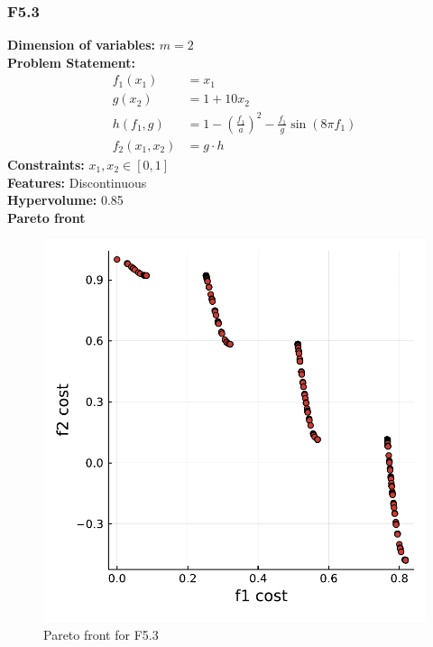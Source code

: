 \documentclass[11pt,oneside,onecolumn,openright]{article}
\begin{document}
   \subsubsection{F5.3~\cite{audet2008multiobjective}}
    \textbf{Dimension of variables: }$m=2$\\
  \noindent\textbf{Problem Statement: }
   \begin{equation}
  \begin{aligned}
  f_1(x_1) &= x_1 \\
  g(x_2) &= 1 + 10x_2\\
  h\left(f_{1}, g\right)&=1-\left(\frac{f_{1}}{a}\right)^{2}-\frac{f_{1}}{g} \sin \left(8 \pi f_{1}\right)\\
  f_2(x_{1}, x_{2})&=g\cdot h
  \end{aligned}
  \end{equation}
  \noindent\textbf{Constraints: } $x_{1}, x_{2} \in[0,1]$\\
  \noindent\textbf{Features: } Discontinuous\\
  \noindent\textbf{Hypervolume: } 0.85\\
  \noindent\textbf{Pareto front}
      \begin{figure}[H]
      \centering
      \includegraphics[width=12cm]{fig/dt2.pdf}
      \cprotect\caption{Pareto front for F5.3}
      \end{figure}
\end{document}
